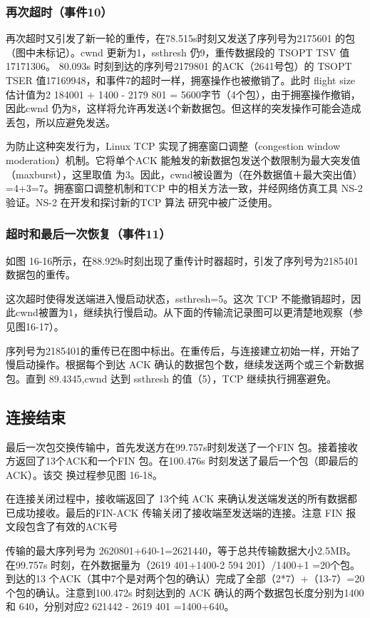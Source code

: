 \subsubsection{再次超时（事件10）}
再次超时又引发了新一轮的重传，在78.515s时刻又发送了序列号为2175601 的包（图中未标记）。cwnd 更新为1，ssthresh 仍9，重传数据段的 TSOPT TSV 值17171306。
80.093s 时刻到达的序列号2179801 的ACK（2641号包）的 TSOPT TSER 值17169948，和事件7的超时一样，拥塞操作也被撤销了。此时 flight size 估计值为2 184001 + 1400 -
2179 801 = 5600字节（4个包），由于拥塞操作撤销，因此cwnd 仍为8，这样将允许再发送4个新数据包。但这样的突发操作可能会造成丢包，所以应避免发送。

为防止这种突发行为，Linux TCP 实现了拥塞窗口调整（congestion window moderation）机制。它将单个ACK 能触发的新数据包发送个数限制为最大突发值（maxburst），这里取值
为3。因此，cwnd被设置为（在外数据值＋最大突出值）=4+3=7。拥塞窗口调整机制和TCP 中的相关方法一致，并经网络仿真工具 NS-2验证。NS-2 在开发和探讨新的TCP 算法
研究中被广泛使用。

\subsubsection{超时和最后一次恢复（事件11）}
如图 16-16所示，在88.929s时刻出现了重传计时器超时，引发了序列号为2185401数据包的重传。

这次超时使得发送端进入慢启动状态，ssthresh=5。这次 TCP 不能撤销超时，因此cwnd被置为1，继续执行慢启动。从下面的传输流记录图可以更清楚地观察（参见图16-17）。

序列号为2185401的重传已在图中标出。在重传后，与连接建立初始一样，开始了慢启动操作。根据每个到达 ACK 确认的数据包个数，继续发送两个或三个新数据包。直到
89.4345,cwnd 达到 ssthresh 的值（5），TCP 继续执行拥塞避免。

\subsection{连接结束}
最后一次包交换传输中，首先发送方在99.757s时刻发送了一个FIN 包。接着接收方返回了13个ACK和一个FIN 包。在100.476s 时刻发送了最后一个包（即最后的ACK）。该交
换过程参见图 16-18。

在连接关闭过程中，接收端返回了 13个纯 ACK 来确认发送端发送的所有数据都已成功接收。最后的FIN-ACK 传输关闭了接收端至发送端的连接。注意 FIN 报文段包含了有效的ACK号

传输的最大序列号为 2620801+640-1=2621440，等于总共传输数据大小2.5MB。在99.757s 时刻，在外数据量为（2619 401+1400-2 594 201）/1400+1 =20个包。到达的13
个ACK（其中7个是对两个包的确认）完成了全部（2*7）+（13-7）=20个包的确认。注意到100.472s 时刻达到的 ACK 确认的两个数据包长度分别为1400和 640，分别对应2 621442 -
2619 401 =1400+640。

